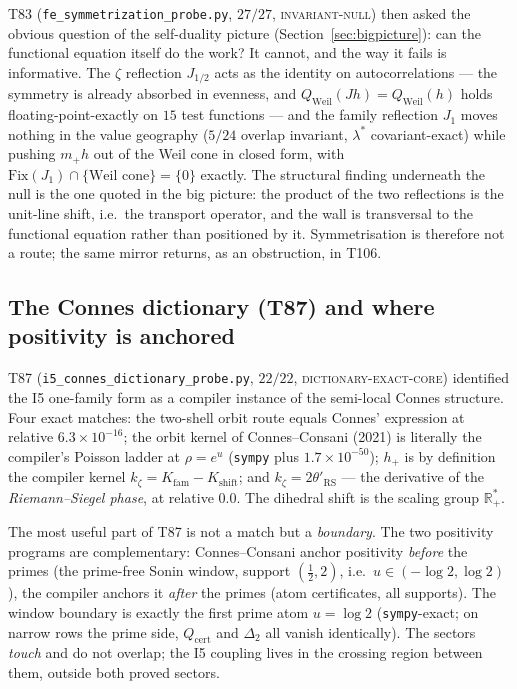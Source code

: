 \documentclass[11pt,a4paper]{article}
\newcommand{\R}{\mathbb R}
\newcommand{\Qcert}{Q_{\mathrm{cert}}}
\begin{document}
T83 (\texttt{fe\_symmetrization\_probe.py}, $27/27$, \textsc{invariant-null}) then asked the obvious
question of the self-duality picture (Section~\ref{sec:bigpicture}): can the functional equation itself
do the work? It cannot, and the way it fails is informative. The $\zeta$ reflection $J_{1/2}$ acts as
the identity on autocorrelations --- the symmetry is already absorbed in evenness, and
$Q_{\mathrm{Weil}}(Jh)=Q_{\mathrm{Weil}}(h)$ holds floating-point-exactly on $15$ test functions --- and
the family reflection $J_1$ moves nothing in the value geography ($5/24$ overlap invariant, $\lambda^*$
covariant-exact) while pushing $m_+h$ out of the Weil cone in closed form, with
$\mathrm{Fix}(J_1)\cap\{\text{Weil cone}\}=\{0\}$ exactly. The structural finding underneath the null is
the one quoted in the big picture: the product of the two reflections is the unit-line shift, i.e.\ the
transport operator, and the wall is transversal to the functional equation rather than positioned by it.
Symmetrisation is therefore not a route; the same mirror returns, as an obstruction, in T106.

\subsection{The Connes dictionary (T87) and where positivity is anchored}
T87 (\texttt{i5\_connes\_dictionary\_probe.py}, $22/22$, \textsc{dictionary-exact-core}) identified the
I5 one-family form as a compiler instance of the semi-local Connes structure. Four exact matches:
the two-shell orbit route equals Connes' expression at relative $6.3\times10^{-16}$; the orbit kernel of
Connes--Consani (2021) is literally the compiler's Poisson ladder at $\rho=e^u$ (\texttt{sympy} plus
$1.7\times10^{-50}$); $h_+$ is by definition the compiler kernel $k_\zeta=K_{\mathrm{fam}}-K_{\mathrm{shift}}$;
and $k_\zeta=2\theta'_{\mathrm{RS}}$ --- the derivative of the \emph{Riemann--Siegel phase}, at relative
$0.0$. The dihedral shift is the scaling group $\R^*_+$.

The most useful part of T87 is not a match but a \emph{boundary}. The two positivity programs are
complementary: Connes--Consani anchor positivity \emph{before} the primes (the prime-free Sonin window,
support $(\tfrac12,2)$, i.e.\ $u\in(-\log2,\log2)$), the compiler anchors it \emph{after} the primes
(atom certificates, all supports). The window boundary is exactly the first prime atom $u=\log2$
(\texttt{sympy}-exact; on narrow rows the prime side, $\Qcert$ and $\Delta_2$ all vanish identically).
The sectors \emph{touch} and do not overlap; the I5 coupling lives in the crossing region between them,
outside both proved sectors.
\end{document}
